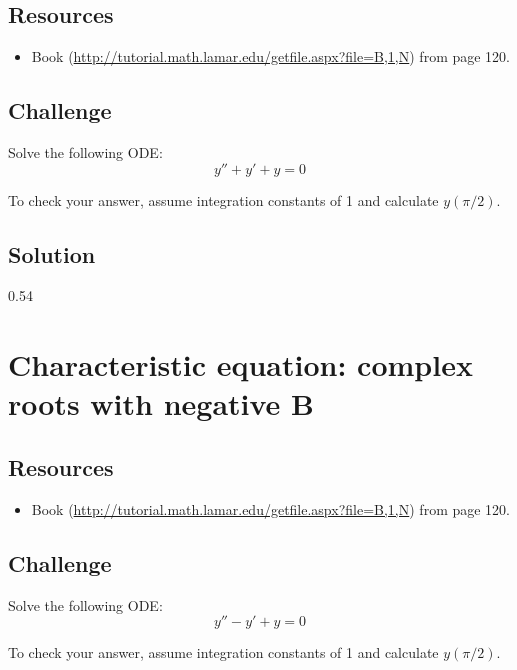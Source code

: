 \subsection*{Resources}
\begin{itemize}
    \item Book (\url{http://tutorial.math.lamar.edu/getfile.aspx?file=B,1,N}) from page 120.
\end{itemize}

\subsection*{Challenge}
Solve the following ODE:
\begin{equation}
    y'' + y' + y = 0
\end{equation}

To check your answer, assume integration constants of 1 and calculate $y(\pi/2)$.

\subsection*{Solution}
0.54

\timebox




\newpage
\section{Characteristic equation: complex roots with negative B}

\subsection*{Resources}
\begin{itemize}
    \item Book (\url{http://tutorial.math.lamar.edu/getfile.aspx?file=B,1,N}) from page 120.
\end{itemize}

\subsection*{Challenge}
Solve the following ODE:
\begin{equation}
    y'' - y' + y = 0
\end{equation}

To check your answer, assume integration constants of 1 and calculate $y(\pi/2)$.

